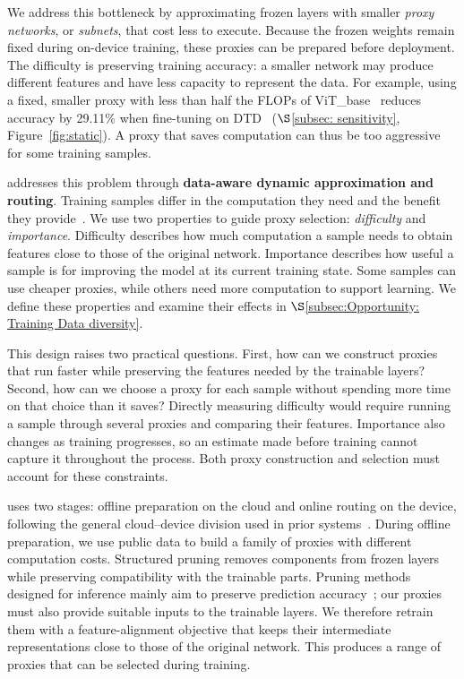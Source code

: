 We address this bottleneck by approximating frozen layers with smaller \textit{proxy networks}, or \textit{subnets}, that cost less to execute.
Because the frozen weights remain fixed during on-device training, these proxies can be prepared before deployment.
The difficulty is preserving training accuracy: a smaller network may produce different features and have less capacity to represent the data.
For example, using a fixed, smaller proxy with less than half the FLOPs of ViT\_base~\cite{dosovitskiy2021an} reduces accuracy by 29.11\% when fine-tuning on DTD~\cite{dtd} ($\S$\ref{subsec: sensitivity}, Figure~\ref{fig:static}).
A proxy that saves computation can thus be too aggressive for some training samples.

\sys addresses this problem through \textbf{data-aware dynamic approximation and routing}.
Training samples differ in the computation they need and the benefit they provide~\cite{ijcai2017p0735, he2019data, 10.1145/3495243.3517016, mercury2021sensys, canel2019scaling, 10.1145/2972413.2972423, 10.1145/3241539.3241557, pmlr-v162-mindermann22a, huang2018multiscale}.
We use two properties to guide proxy selection: \textit{difficulty} and \textit{importance}.
Difficulty describes how much computation a sample needs to obtain features close to those of the original network.
Importance describes how useful a sample is for improving the model at its current training state.
Some samples can use cheaper proxies, while others need more computation to support learning.
We define these properties and examine their effects in $\S$\ref{subsec:Opportunity: Training Data diversity}.

This design raises two practical questions.
First, how can we construct proxies that run faster while preserving the features needed by the trainable layers?
Second, how can we choose a proxy for each sample without spending more time on that choice than it saves?
Directly measuring difficulty would require running a sample through several proxies and comparing their features.
Importance also changes as training progresses, so an estimate made before training cannot capture it throughout the process.
Both proxy construction and selection must account for these constraints.

\sys uses two stages: offline preparation on the cloud and online routing on the device, following the general cloud--device division used in prior systems~\cite{wen2023adaptivenet, Fang_2018, wang2022melon}.
During offline preparation, we use public data to build a family of proxies with different computation costs.
Structured pruning removes components from frozen layers while preserving compatibility with the trainable parts.
Pruning methods designed for inference mainly aim to preserve prediction accuracy~\cite{torchpruninggithub, krishnan2019structural}; our proxies must also provide suitable inputs to the trainable layers.
We therefore retrain them with a feature-alignment objective that keeps their intermediate representations close to those of the original network.
This produces a range of proxies that can be selected during training.

